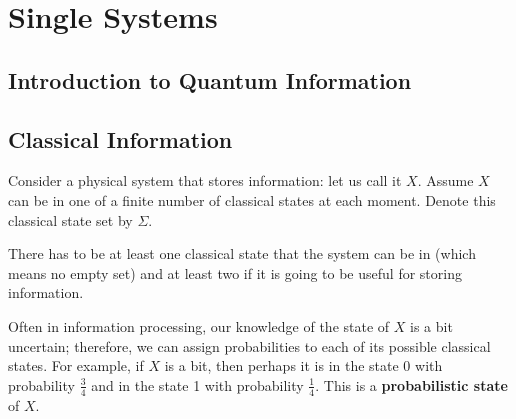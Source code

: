 \chapter{Single Systems}
\section{Introduction to Quantum Information}

\section{Classical Information}
Consider a physical system that stores information: let us call it $X$. Assume $X$ can be in one of a finite number of classical states at each moment. Denote this classical state set by $\Sigma$.

There has to be at least one classical state that the system can be in (which means no empty set) and at least two if it is going to be useful for storing information.

\bigbreak

Often in information processing, our knowledge of the state of $X$ is a bit uncertain; therefore, we can assign probabilities to each of its possible classical states. For example, if $X$ is a bit, then perhaps it is in the state 0 with probability $\frac{3}{4}$ and in the state 1 with probability $\frac{1}{4}$. This is a \textbf{probabilistic state} of $X$.

